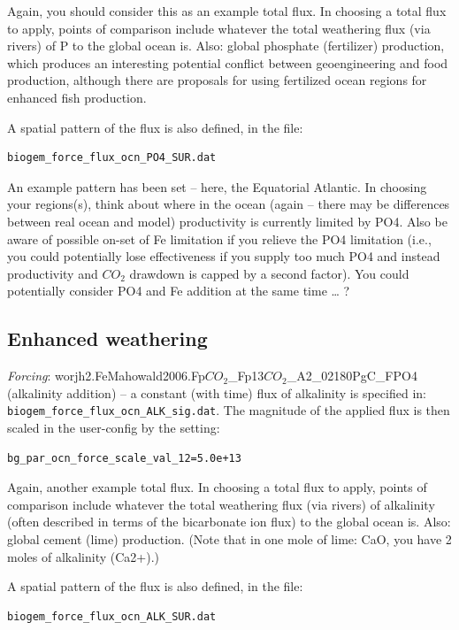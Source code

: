 \documentclass[11pt,fleqn]{book} %
\begin{document}
Again, you should consider this as an example total flux. In choosing a total flux to apply, points of comparison include whatever the total weathering flux (via rivers) of P to the global ocean is. Also: global phosphate (fertilizer) production, which produces an interesting potential conflict between geoengineering and food production, although there are proposals for using fertilized ocean regions for enhanced fish production. 

A spatial pattern of the flux is also defined, in the file:
\small\begin{verbatim}
biogem_force_flux_ocn_PO4_SUR.dat
\end{verbatim}\normalsize

An example pattern has been set – here, the Equatorial Atlantic. In choosing your regions(s), think about where in the ocean (again – there may be differences between real ocean and model) productivity is currently limited by PO4. Also be aware of possible on-set of Fe limitation if you relieve the PO4 limitation (i.e., you could potentially lose effectiveness if you supply too much PO4 and instead productivity and \(CO_{2}\) drawdown is capped by a second factor). You could potentially consider PO4 and Fe addition at the same time … ?


\subsection{Enhanced weathering}

\textit{Forcing}: \textsf{\footnotesize worjh2.FeMahowald2006.Fp\(CO_{2}\)\_Fp13\(CO_{2}\)\_A2\_02180PgC\_FPO4} (alkalinity addition) -- a constant (with time) flux of alkalinity is specified in: \texttt{biogem\_force\_flux\_ocn\_ALK\_sig.dat}. The magnitude of the applied flux is then scaled in the user-config by the setting:
\small\begin{verbatim}
bg_par_ocn_force_scale_val_12=5.0e+13
\end{verbatim}\normalsize

Again, another example total flux. In choosing a total flux to apply, points of comparison include whatever the total weathering flux (via rivers) of alkalinity (often described in terms of the bicarbonate ion flux) to the global ocean is. Also: global cement (lime) production. (Note that in one mole of lime: CaO, you have 2 moles of alkalinity (Ca2+).) 

A spatial pattern of the flux is also defined, in the file:
\small\begin{verbatim}
biogem_force_flux_ocn_ALK_SUR.dat
\end{verbatim}\normalsize
\end{document}
